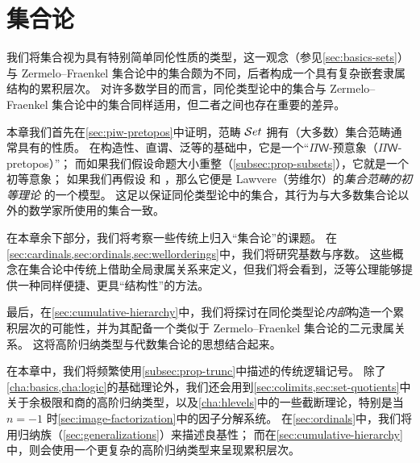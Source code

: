 \chapter{集合论}
\label{cha:set-math}

%

我们将集合视为具有特别简单同伦性质的类型，这一观念（参见\cref{sec:basics-sets}）与 Zermelo--Fraenkel 集合论中的集合颇为不同，后者构成一个具有复杂嵌套隶属结构的累积层次。
对许多数学目的而言，同伦类型论中的集合与 Zermelo--Fraenkel 集合论中的集合同样适用，但二者之间也存在重要的差异。

本章我们首先在\cref{sec:piw-pretopos}中证明，范畴 $\mathcal{S}et$ 拥有（大多数）集合范畴通常具有的性质。
%
%
在构造性、直谓、泛等的基础中，它是一个“$\Pi\mathsf{W}$-预意象（$\Pi\mathsf{W}$-pretopos）”；
%
而如果我们假设命题大小重整（\cref{subsec:prop-subsets}），它就是一个初等意象；
如果我们再假设 \LEM{} 和 \choice{}，那么它便是 Lawvere（劳维尔）的\emph{集合范畴的初等理论} 的一个模型。
%
这足以保证同伦类型论中的集合，其行为与大多数集合论以外的数学家所使用的集合一致。

在本章余下部分，我们将考察一些传统上归入“集合论”的课题。
在\cref{sec:cardinals,sec:ordinals,sec:wellorderings}中，我们将研究基数与序数。
这些概念在集合论中传统上借助全局隶属关系来定义，但我们将会看到，泛等公理能够提供一种同样便捷、更具“结构性”的方法。

最后，在\cref{sec:cumulative-hierarchy}中，我们将探讨在同伦类型论\emph{内部}构造一个累积层次的可能性，并为其配备一个类似于 Zermelo--Fraenkel 集合论的二元隶属关系。
这将高阶归纳类型与代数集合论的思想结合起来。
%
%

在本章中，我们将频繁使用\cref{subsec:prop-trunc}中描述的传统逻辑记号。
除了\cref{cha:basics,cha:logic}的基础理论外，我们还会用到\cref{sec:colimits,sec:set-quotients}中关于余极限和商的高阶归纳类型，以及\cref{cha:hlevels}中的一些截断理论，特别是当 $n=-1$ 时\cref{sec:image-factorization}中的因子分解系统。
在\cref{sec:ordinals}中，我们将用归纳族（\cref{sec:generalizations}）来描述良基性；
而在\cref{sec:cumulative-hierarchy}中，则会使用一个更复杂的高阶归纳类型来呈现累积层次。

